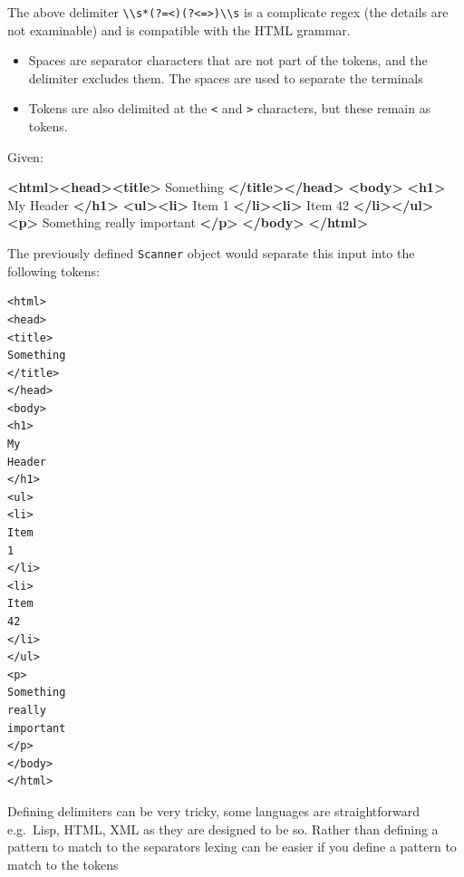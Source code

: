 \documentclass[
]{book}
\newenvironment{Shaded}{\begin{snugshade}}{\end{snugshade}}
\newcommand{\KeywordTok}[1]{\textcolor[rgb]{0.13,0.29,0.53}{\textbf{#1}}}
\newcommand{\NormalTok}[1]{#1}
\providecommand{\tightlist}{%
  \setlength{\itemsep}{0pt}\setlength{\parskip}{0pt}}
\begin{document}
The above delimiter \texttt{\textbackslash{}\textbackslash{}s*(?=\textless{})\textbar{}(?\textless{}=\textgreater{})\textbackslash{}\textbackslash{}s} is a complicate regex (the details are not examinable) and is compatible with the HTML grammar.

\begin{itemize}
\tightlist
\item
  Spaces are separator characters that are not part of the tokens, and the delimiter excludes them. The spaces are used to separate the terminals
\item
  Tokens are also delimited at the \texttt{\textless{}} and \texttt{\textgreater{}} characters, but these remain as tokens.
\end{itemize}

Given:

\begin{Shaded}
\begin{Highlighting}[]
\KeywordTok{\textless{}html\textgreater{}\textless{}head\textgreater{}\textless{}title\textgreater{}}\NormalTok{ Something }\KeywordTok{\textless{}/title\textgreater{}\textless{}/head\textgreater{}}
\KeywordTok{\textless{}body\textgreater{}} \KeywordTok{\textless{}h1\textgreater{}}\NormalTok{ My Header }\KeywordTok{\textless{}/h1\textgreater{}}
\KeywordTok{\textless{}ul\textgreater{}\textless{}li\textgreater{}}\NormalTok{ Item 1 }\KeywordTok{\textless{}/li\textgreater{}\textless{}li\textgreater{}}\NormalTok{ Item 42 }\KeywordTok{\textless{}/li\textgreater{}\textless{}/ul\textgreater{}}
\KeywordTok{\textless{}p\textgreater{}}\NormalTok{ Something really important }\KeywordTok{\textless{}/p\textgreater{}}
\KeywordTok{\textless{}/body\textgreater{}}
\KeywordTok{\textless{}/html\textgreater{}}
\end{Highlighting}
\end{Shaded}

The previously defined \texttt{Scanner} object would separate this input into the following tokens:

\begin{verbatim}
<html>
<head>
<title> 
Something 
</title>
</head>
<body>
<h1>
My
Header
</h1>
<ul>
<li> 
Item 
1 
</li>
<li>
Item 
42 
</li>
</ul>
<p> 
Something 
really 
important 
</p>
</body>
</html>
\end{verbatim}

Defining delimiters can be very tricky, some languages are straightforward e.g.~Lisp, HTML, XML as they are designed to be so. Rather than defining a pattern to match to the separators lexing can be easier if you define a pattern to match to the tokens
\end{document}
